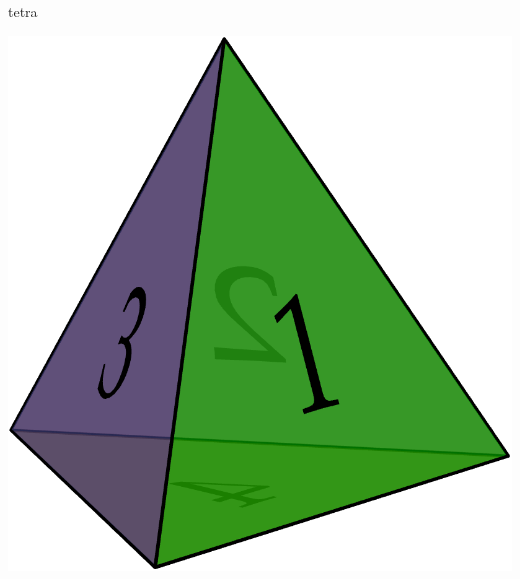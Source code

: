 \begin{examples}{}{tetra}
\begin{enumerate}
\begin{minipage}[t]{0.3\linewidth}
	  	\flushright\href{https://www.math.uci.edu/~ndonalds/math120a/perm-a4.html}{\includegraphics[scale=0.14]{perm-a4.png}}
	  \end{minipage}
	
	\end{enumerate}
\end{examples}


